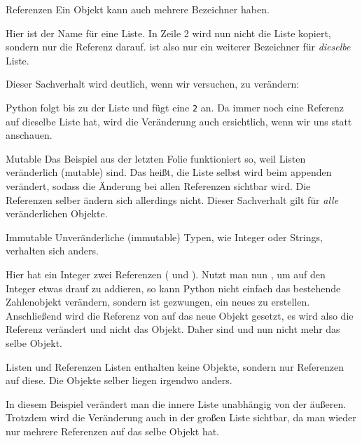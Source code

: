 \begin{frame}{Referenzen}
	Ein Objekt kann auch mehrere Bezeichner haben.
	
	Hier ist  der Name für eine Liste. In Zeile 2 wird nun nicht die Liste kopiert, sondern nur die Referenz darauf.  ist also nur ein weiterer Bezeichner für \textit{dieselbe} Liste.
	
	Dieser Sachverhalt wird deutlich, wenn wir versuchen,  zu verändern:
	
	Python folgt  bis zu der Liste und fügt eine \texttt{2} an. Da  immer noch eine Referenz auf dieselbe Liste hat, wird die Veränderung auch ersichtlich, wenn wir uns  statt  anschauen.
\end{frame}

\begin{frame}{Mutable}
	Das Beispiel aus der letzten Folie funktioniert so, weil Listen veränderlich (mutable) sind. Das heißt, die Liste selbst wird beim appenden verändert, sodass die Änderung bei allen Referenzen sichtbar wird. \alert{Die Referenzen selber ändern sich allerdings nicht.} Dieser Sachverhalt gilt für \textit{alle} veränderlichen Objekte.
\end{frame}

\begin{frame}{Immutable}
	Unveränderliche (immutable) Typen, wie Integer oder Strings, verhalten sich anders.
	
	Hier hat ein Integer zwei Referenzen ( und ). Nutzt man nun , um auf den Integer etwas drauf zu addieren, so kann Python nicht einfach das bestehende Zahlenobjekt verändern, sondern ist gezwungen, ein neues zu erstellen. Anschließend wird die Referenz von  auf das neue Objekt gesetzt, es wird also die Referenz verändert und nicht das Objekt. Daher sind  und  nun nicht mehr das selbe Objekt.
\end{frame}

\begin{frame}{Listen und Referenzen}
	Listen enthalten keine Objekte, sondern nur Referenzen auf diese. Die Objekte selber liegen irgendwo anders.
	
	In diesem Beispiel verändert man die innere Liste unabhängig von der äußeren. Trotzdem wird die Veränderung auch in der großen Liste sichtbar, da man wieder nur mehrere Referenzen auf das selbe Objekt hat.
\end{frame}

